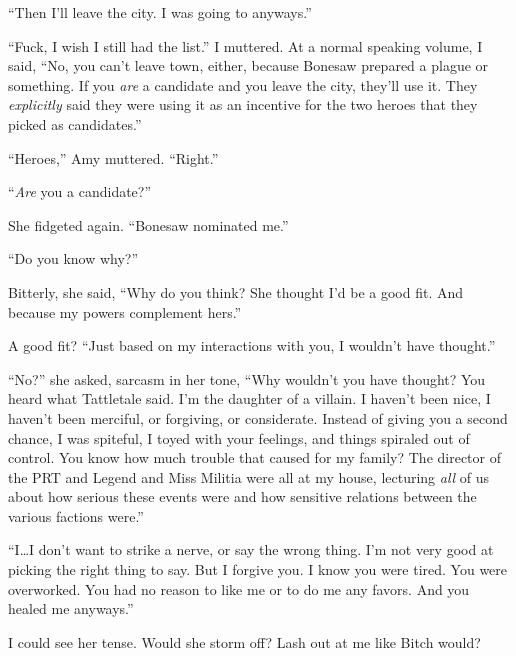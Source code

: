 ``Then I'll leave the city.  I was going to anyways.''



``Fuck, I wish I still had the list.'' I muttered.  At a normal speaking volume, I said, ``No, you can't leave town, either, because Bonesaw prepared a plague or something.  If you \emph{are} a candidate and you leave the city, they'll use it.  They \emph{explicitly} said they were using it as an incentive for the two heroes that they picked as candidates.''



``Heroes,'' Amy muttered.  ``Right.''



``\emph{Are} you a candidate?''



She fidgeted again.  ``Bonesaw nominated me.''



``Do you know why?''



Bitterly, she said, ``Why do you think?  She thought I'd be a good fit.  And because my powers complement hers.''



A good fit?  ``Just based on my interactions with you, I wouldn't have thought.''



``No?'' she asked, sarcasm in her tone, ``Why wouldn't you have thought?  You heard what Tattletale said.  I'm the daughter of a villain.  I haven't been nice, I haven't been merciful, or forgiving, or considerate.  Instead of giving you a second chance, I was spiteful, I toyed with your feelings, and things spiraled out of control.  You know how much trouble that caused for my family?  The director of the PRT and Legend and Miss Militia were all at my house, lecturing \emph{all} of us about how serious these events were and how sensitive relations between the various factions were.''



``I\ldots I don't want to strike a nerve, or say the wrong thing.  I'm not very good at picking the right thing to say.  But I forgive you.  I know you were tired.  You were overworked.  You had no reason to like me or to do me any favors.  And you healed me anyways.''



I could see her tense.  Would she storm off?  Lash out at me like Bitch would?



